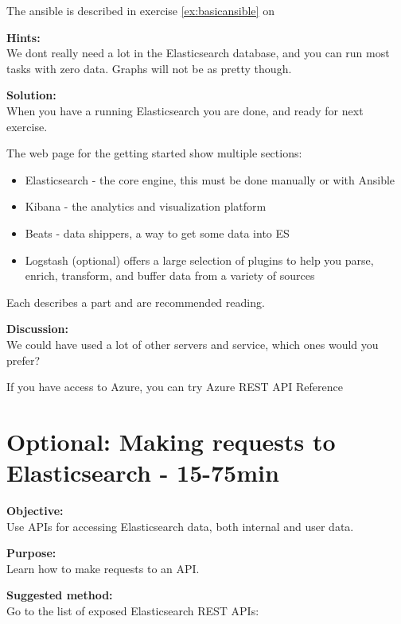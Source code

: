\documentclass[a4paper,11pt,notitlepage]{report}
\begin{document}
The ansible is described in exercise \ref{ex:basicansible} on \pageref{ex:basicansible}

{\bf Hints:}\\
We dont really need a lot in the Elasticsearch database, and you can run most tasks with zero data. Graphs will not be as pretty though.

{\bf Solution:}\\
When you have a running Elasticsearch you are done, and ready for next exercise.

The web page for the getting started show multiple sections:
\begin{itemize}
\item Elasticsearch - the core engine, this must be done manually or with Ansible
\item Kibana - the analytics and visualization platform
\item Beats - data shippers, a way to get some data into ES
\item Logstash (optional) offers a large selection of plugins to help you parse, enrich, transform, and buffer data from a variety of sources
\end{itemize}

Each describes a part and are recommended reading.

{\bf Discussion:}\\
We could have used a lot of other servers and service, which ones would you prefer?

If you have access to Azure, you can try Azure REST API Reference\\ 

\chapter{Optional: Making requests to Elasticsearch - 15-75min}
\label{ex:es-rest-api}


{\bf Objective:}\\
Use APIs for accessing Elasticsearch data, both internal and user data.

{\bf Purpose:}\\
Learn how to make requests to an API.

{\bf Suggested method:}\\
Go to the list of exposed Elasticsearch REST APIs:\\
\end{document}
